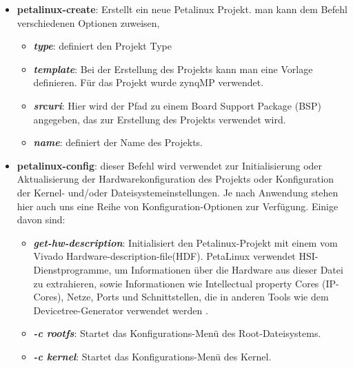 \begin{itemize}
	\item \textbf{petalinux-create}: Erstellt ein neue Petalinux Projekt. man kann dem Befehl verschiedenen Optionen zuweisen, 
	\begin{itemize}
		\item \textbf{\emph{type}}: definiert den Projekt Type
		
		\item \textbf{\emph{template}}: Bei der Erstellung des Projekts kann man eine Vorlage definieren. Für das Projekt wurde zynqMP verwendet.
		
		\item \textbf{\emph{srcuri}}: Hier wird der Pfad zu einem Board Support Package (BSP) angegeben, das zur Erstellung des Projekts verwendet wird. 
		
		\item \textbf{\emph{name}}: definiert der Name des Projekts. 
	\end{itemize}
	
	\item \textbf{petalinux-config}: dieser Befehl wird verwendet zur Initialisierung oder Aktualisierung der Hardwarekonfiguration des Projekts oder Konfiguration der Kernel- und/oder Dateisystemeinstellungen. Je nach Anwendung stehen hier auch uns eine Reihe von Konfiguration-Optionen zur Verfügung. Einige davon sind:
	\begin{itemize}
		\item \textbf{\emph{get-hw-description}}: Initialisiert den Petalinux-Projekt mit einem vom Vivado Hardware-description-file(HDF). PetaLinux verwendet HSI-Dienstprogramme, um Informationen über die Hardware aus dieser Datei zu extrahieren, sowie Informationen wie Intellectual property Cores (IP-Cores), Netze, Ports und Schnittstellen, die in anderen Tools wie dem Devicetree-Generator verwendet werden .
		
		\item \textbf{\emph{-c rootfs}}: Startet das Konfigurations-Menü des Root-Dateisystems.
		
		\item \textbf{\emph{-c kernel}}: Startet das Konfigurations-Menü des Kernel. 
	\end{itemize}
	

\end{itemize}
